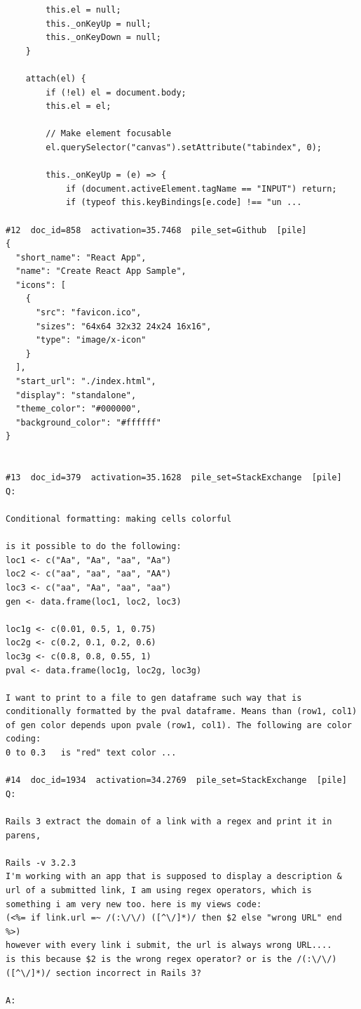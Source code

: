 \begin{verbatim}
        this.el = null;
        this._onKeyUp = null;
        this._onKeyDown = null;
    }

    attach(el) {
        if (!el) el = document.body;
        this.el = el;

        // Make element focusable
        el.querySelector("canvas").setAttribute("tabindex", 0);

        this._onKeyUp = (e) => {
            if (document.activeElement.tagName == "INPUT") return;
            if (typeof this.keyBindings[e.code] !== "un ...

#12  doc_id=858  activation=35.7468  pile_set=Github  [pile]
{
  "short_name": "React App",
  "name": "Create React App Sample",
  "icons": [
    {
      "src": "favicon.ico",
      "sizes": "64x64 32x32 24x24 16x16",
      "type": "image/x-icon"
    }
  ],
  "start_url": "./index.html",
  "display": "standalone",
  "theme_color": "#000000",
  "background_color": "#ffffff"
}


#13  doc_id=379  activation=35.1628  pile_set=StackExchange  [pile]
Q:

Conditional formatting: making cells colorful

is it possible to do the following:
loc1 <- c("Aa", "Aa", "aa", "Aa")
loc2 <- c("aa", "aa", "aa", "AA")
loc3 <- c("aa", "Aa", "aa", "aa")
gen <- data.frame(loc1, loc2, loc3)

loc1g <- c(0.01, 0.5, 1, 0.75)
loc2g <- c(0.2, 0.1, 0.2, 0.6)
loc3g <- c(0.8, 0.8, 0.55, 1)
pval <- data.frame(loc1g, loc2g, loc3g)

I want to print to a file to gen dataframe such way that is conditionally formatted by the pval dataframe. Means than (row1, col1) of gen color depends upon pvale (row1, col1). The following are color coding:
0 to 0.3   is "red" text color ...

#14  doc_id=1934  activation=34.2769  pile_set=StackExchange  [pile]
Q:

Rails 3 extract the domain of a link with a regex and print it in parens,

Rails -v 3.2.3
I'm working with an app that is supposed to display a description & url of a submitted link, I am using regex operators, which is something i am very new too. here is my views code:
(<%= if link.url =~ /(:\/\/) ([^\/]*)/ then $2 else "wrong URL" end %>)
however with every link i submit, the url is always wrong URL.... 
is this because $2 is the wrong regex operator? or is the /(:\/\/) ([^\/]*)/ section incorrect in Rails 3?

A:


\end{verbatim}
